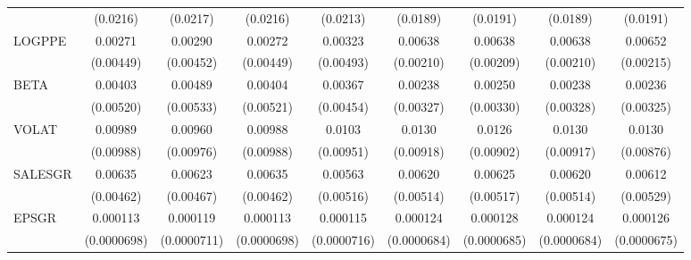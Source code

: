 \begin{table}[htbp]
\begin{tabular}{l*{8}{c}}
                    &    (0.0216)         &    (0.0217)         &    (0.0216)         &    (0.0213)         &    (0.0189)         &    (0.0191)         &    (0.0189)         &    (0.0191)         \\
LOGPPE              &     0.00271         &     0.00290         &     0.00272         &     0.00323         &     0.00638\sym{***}&     0.00638\sym{***}&     0.00638\sym{***}&     0.00652\sym{***}\\
                    &   (0.00449)         &   (0.00452)         &   (0.00449)         &   (0.00493)         &   (0.00210)         &   (0.00209)         &   (0.00210)         &   (0.00215)         \\
BETA                &     0.00403         &     0.00489         &     0.00404         &     0.00367         &     0.00238         &     0.00250         &     0.00238         &     0.00236         \\
                    &   (0.00520)         &   (0.00533)         &   (0.00521)         &   (0.00454)         &   (0.00327)         &   (0.00330)         &   (0.00328)         &   (0.00325)         \\
VOLAT               &     0.00989         &     0.00960         &     0.00988         &      0.0103         &      0.0130         &      0.0126         &      0.0130         &      0.0130         \\
                    &   (0.00988)         &   (0.00976)         &   (0.00988)         &   (0.00951)         &   (0.00918)         &   (0.00902)         &   (0.00917)         &   (0.00876)         \\
SALESGR             &     0.00635         &     0.00623         &     0.00635         &     0.00563         &     0.00620         &     0.00625         &     0.00620         &     0.00612         \\
                    &   (0.00462)         &   (0.00467)         &   (0.00462)         &   (0.00516)         &   (0.00514)         &   (0.00517)         &   (0.00514)         &   (0.00529)         \\
EPSGR               &    0.000113         &    0.000119\sym{*}  &    0.000113         &    0.000115         &    0.000124\sym{*}  &    0.000128\sym{*}  &    0.000124\sym{*}  &    0.000126\sym{*}  \\
                    & (0.0000698)         & (0.0000711)         & (0.0000698)         & (0.0000716)         & (0.0000684)         & (0.0000685)         & (0.0000684)         & (0.0000675)         \\

\end{tabular}
\end{table}
